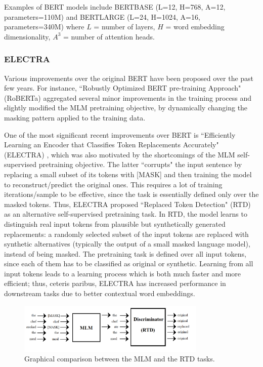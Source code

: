\documentclass[preprint,review,12pt]{elsarticle}
\begin{document}
Examples of BERT models include BERTBASE (L=12, H=768, A=12, parameters=110M) and BERTLARGE (L=24, H=1024, A=16, parameters=340M) where $L$ = number of layers, $H$ = word embedding dimensionality, $A^{3}$ = number of attention heads.

\subsubsection{ELECTRA}
Various improvements over the original BERT have been proposed over the past few years. For instance, ``Robustly Optimized BERT pre-training Approach" (RoBERTa) \cite{roberta} aggregated several minor improvements in the training process and slightly modified the MLM pretraining objective, by dynamically changing the masking pattern applied to the training data.

One of the most significant recent improvements over BERT is ``Efficiently Learning an Encoder that Classifies Token Replacements Accurately" (ELECTRA) \cite{karta}, which was also motivated by the shortcomings of the MLM self-supervised pretraining objective. The latter ``corrupts" the input sentence by replacing a small subset of its tokens with [MASK] and then training the model to reconstruct/predict the original ones. This requires a lot of training iterations/sample to be effective, since the task is essentially defined only over the masked tokens. Thus, ELECTRA proposed ``Replaced Token Detection" (RTD) as an alternative self-supervised pretraining task. In RTD, the model learns to distinguish real input tokens from plausible but synthetically generated replacements: a randomly selected subset of the input tokens are replaced with synthetic alternatives (typically the output of a small masked language model), instead of being masked. The pretraining task is defined over all input tokens, since each of them has to be classified as original or synthetic. Learning from all input tokens leads to a learning process which is both much faster and more efficient; thus, ceteris paribus, ELECTRA has increased performance in downstream tasks due to better contextual word embeddings.

\begin{figure}[H]
    \includegraphics[width=9cm]{MLMRTD.png}
    \centering
    \caption{Graphical comparison between the MLM and the RTD tasks.}
\end{figure}
\end{document}
